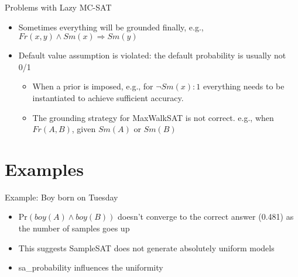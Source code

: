 \documentclass{beamer}
\newcommand{\Prob}{\mbox{Pr}}
\begin{document}
\begin{frame}{Problems with Lazy MC-SAT}

	\begin{itemize}

		\item Sometimes everything will be grounded finally, e.g., $Fr(x, y)
			\wedge Sm(x) \Rightarrow Sm(y)$

		\item Default value assumption is violated: the default probability is
			usually not 0/1

			\begin{itemize}

				\item When a prior is imposed, e.g., for $\neg Sm(x): 1$
					everything needs to be instantiated to achieve sufficient
					accuracy. 

				\item The grounding strategy for MaxWalkSAT is not correct.
					e.g., when $Fr(A, B)$, given $Sm(A)$ or $Sm(B)$

			\end{itemize}

	\end{itemize}

\end{frame}

\section{Examples}

\begin{frame}{Example: Boy born on Tuesday}

	\begin{quote}
	\end{quote}

	\begin{itemize}
		\item $\Prob(boy(A) \wedge boy(B))$ doesn't converge to the correct
			answer (0.481) as the number of samples goes up
		\item This suggests SampleSAT does not generate absolutely uniform
			models
		\item sa\_probability influences the uniformity
	\end{itemize}

\end{frame}
\end{document}
